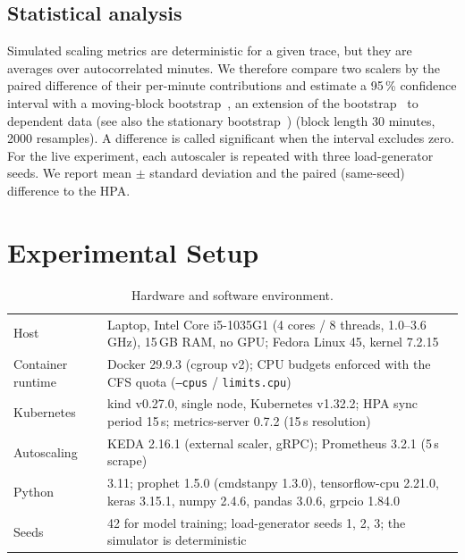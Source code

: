 \documentclass[conference,a4paper]{IEEEtran}
\begin{document}
\subsection{Statistical analysis}
Simulated scaling metrics are deterministic for a given trace, but they are averages over autocorrelated minutes.
We therefore compare two scalers by the paired difference of their per-minute contributions and estimate a 95\,\%
confidence interval with a moving-block bootstrap~\cite{kunsch1989}, an extension of the bootstrap~\cite{efron1979} to dependent data
(see also the stationary bootstrap~\cite{politis1994}) (block length 30 minutes, 2000 resamples).
A difference is called significant when the interval excludes zero. For the live experiment, each autoscaler is
repeated with three load-generator seeds. We report mean $\pm$ standard deviation and the paired (same-seed)
difference to the HPA.

\section{Experimental Setup}\label{sec:setup}
\begin{table}[!t]\centering
\caption{Hardware and software environment.}\label{tab:env}
\small
\begin{tabularx}{\textwidth}{@{}lL@{}}\toprule
Host & Laptop, Intel Core i5-1035G1 (4 cores / 8 threads, 1.0--3.6\,GHz), 15\,GB RAM, no GPU; Fedora Linux 45, kernel 7.2.15 \\
Container runtime & Docker 29.9.3 (cgroup v2); CPU budgets enforced with the CFS quota (\texttt{--cpus} / \texttt{limits.cpu}) \\
Kubernetes & kind v0.27.0, single node, Kubernetes v1.32.2; HPA sync period 15\,s; metrics-server 0.7.2 (15\,s resolution) \\
Autoscaling & KEDA 2.16.1 (external scaler, gRPC); Prometheus 3.2.1 (5\,s scrape) \\
Python & 3.11; prophet 1.5.0 (cmdstanpy 1.3.0), tensorflow-cpu 2.21.0, keras 3.15.1, numpy 2.4.6, pandas 3.0.6, grpcio 1.84.0 \\
Seeds & 42 for model training; load-generator seeds 1, 2, 3; the simulator is deterministic \\
\bottomrule\end{tabularx}
\end{table}
\end{document}
